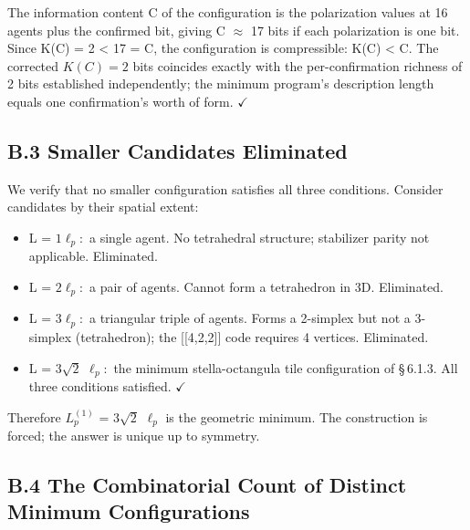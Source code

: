 \documentclass[11pt,oneside]{report}
\theoremstyle{definition}
\theoremstyle{remark}
\begin{document}
The information content \textbar C\textbar{} of the configuration is the
polarization values at 16 agents plus the confirmed bit, giving
\textbar C\textbar{} \ensuremath{\approx} 17 bits if each polarization is one bit. Since
K(C) = 2 \textless{} 17 = \textbar C\textbar, the configuration is
compressible: K(C) \textless{} \textbar C\textbar. The corrected
\ensuremath{K(C) = 2} bits coincides exactly with the per-confirmation richness of 2
bits established independently; the minimum program's description length
equals one confirmation's worth of form. \ensuremath{\checkmark}

\subsection*{B.3 Smaller Candidates Eliminated}

We verify that no smaller configuration satisfies all three conditions.
Consider candidates by their spatial extent:

\begin{itemize}
\item
  L = \ensuremath{1\ell_{p}:} a single agent. No tetrahedral structure; stabilizer parity
  not applicable. Eliminated.
\end{itemize}

\begin{itemize}
\item
  L = \ensuremath{2\ell_{p}:} a pair of agents. Cannot form a tetrahedron in 3D.
  Eliminated.
\end{itemize}

\begin{itemize}
\item
  L = \ensuremath{3\ell_{p}:} a triangular triple of agents. Forms a 2-simplex but not a
  3-simplex (tetrahedron); the [[4,2,2]] code requires 4
  vertices. Eliminated.
\end{itemize}

\begin{itemize}
\item
  L = \ensuremath{3\sqrt{2}} \ensuremath{\ell_{p}:} the minimum stella-octangula tile configuration of \S\,6.1.3.
  All three conditions satisfied. \ensuremath{\checkmark}
\end{itemize}

Therefore \ensuremath{L_{p}^{(1)}} = \ensuremath{3\sqrt{2}} \ensuremath{\ell_{p}} is the geometric minimum. The
construction is forced; the answer is unique up to symmetry.

\subsection*{B.4 The Combinatorial Count of Distinct Minimum Configurations}
\end{document}
